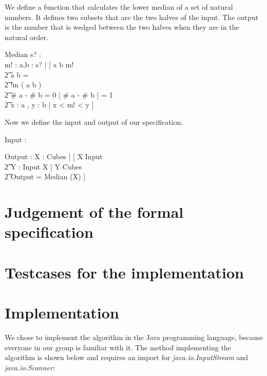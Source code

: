 \documentclass[12pt]{article}
\begin{document}
We define a function that calculates the lower median of a set of natural numbers. It defines two subsets that are the two halves of the input. The output is the number that is wedged between the two halves when they are in the natural order.
\begin{schema}{Median}
s? : \power \nat \\
m! : \nat
\where
\exists a,b : \power s? | [ \: a \union b \union m! \\
                          \t2 a \cap b = \empty \\
                          \t2 !m \notin ( a \union b ) \\
                          \t2 \# a - \# b = 0 \: \vee | \# a - \# b | = 1 \\
                          \t2 \forall x : a , y : b | x < m! < y \: ]
\end{schema}

Now we define the input and output of our specification.
\begin{axdef}
Input : \seq \nat
\end{axdef}

\begin{axdef}
Output : \nat
\where
\exists X : Cubes | [ \: X \subseteq \ran Input \\ \t2 \forall Y : \ran Input \setminus X | Y \not\subseteq Cubes \\ \t2 Output = Median (X) \: ]
\end{axdef}

\section{Judgement of the formal specification}

\section{Testcases for the implementation}

\appendix

\section{Implementation}
We chose to implement the algorithm in the Java programming language, because everyone in our group is familiar with it. The method implementing the algorithm is shown below and requires an import for \textsl{java.io.InputStream} and \textsl{java.io.Scanner}:
\end{document}
